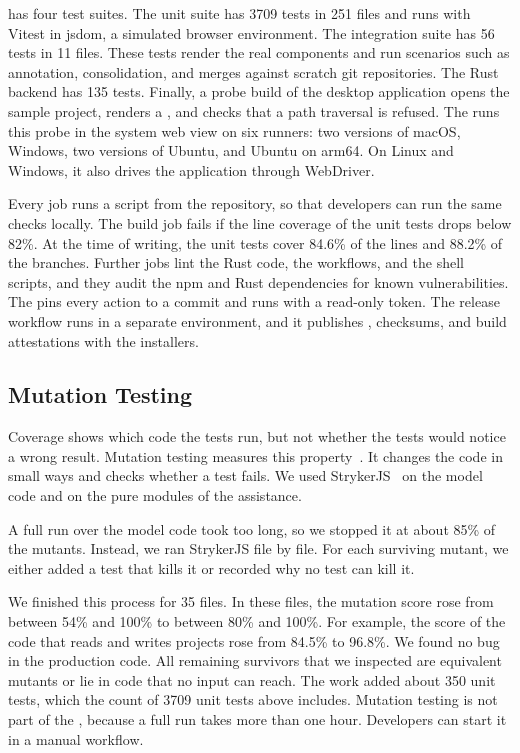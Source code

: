 \SaiLoR has four test suites.
The unit suite has 3709 tests in 251 files and runs with Vitest in jsdom, a simulated browser environment.
The integration suite has 56 tests in 11 files.
These tests render the real components and run scenarios such as annotation, consolidation, and merges against scratch git repositories.
The Rust backend has 135 tests.
Finally, a probe build of the desktop application opens the sample project, renders a \PDF, and checks that a path traversal is refused.
The \CI runs this probe in the system web view on six runners: two versions of macOS, Windows, two versions of Ubuntu, and Ubuntu on arm64.
On Linux and Windows, it also drives the application through WebDriver.

Every \CI job runs a script from the repository, so that developers can run the same checks locally.
The build job fails if the line coverage of the unit tests drops below 82\%.
At the time of writing, the unit tests cover 84.6\% of the lines and 88.2\% of the branches.
Further jobs lint the Rust code, the workflows, and the shell scripts, and they audit the npm and Rust dependencies for known vulnerabilities.
The \CI pins every action to a commit and runs with a read-only token.
The release workflow runs in a separate environment, and it publishes \SBOMs, checksums, and build attestations with the installers.

\subsection{Mutation Testing}\label{sec:requirements-mutation}

Coverage shows which code the tests run, but not whether the tests would notice a wrong result.
Mutation testing measures this property~\cite{jia2011mutation}.
It changes the code in small ways and checks whether a test fails.
We used StrykerJS~\cite{stryker} on the model code and on the pure modules of the \LLM assistance.

A full run over the model code took too long, so we stopped it at about 85\% of the mutants.
Instead, we ran StrykerJS file by file.
For each surviving mutant, we either added a test that kills it or recorded why no test can kill it.

We finished this process for 35 files.
In these files, the mutation score rose from between 54\% and 100\% to between 80\% and 100\%.
For example, the score of the code that reads and writes projects rose from 84.5\% to 96.8\%.
We found no bug in the production code.
All remaining survivors that we inspected are equivalent mutants or lie in code that no input can reach.
The work added about 350 unit tests, which the count of 3709 unit tests above includes.
Mutation testing is not part of the \CI, because a full run takes more than one hour.
Developers can start it in a manual workflow.
